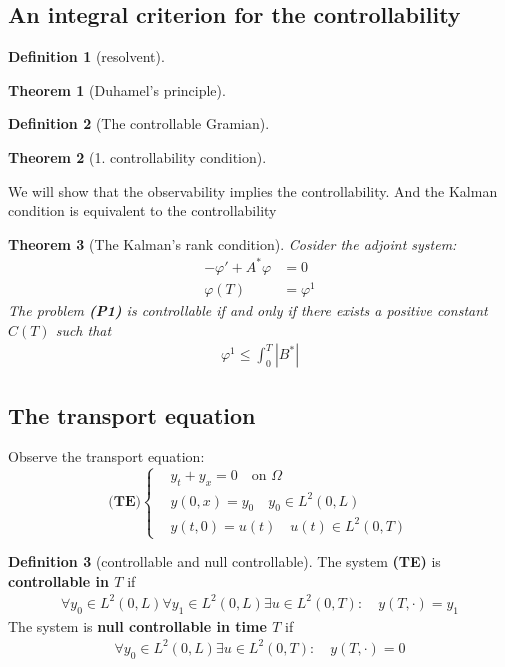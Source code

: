\documentclass[a4paper,11pt,fleqn]{book}
\newtheorem{theorem}{Theorem}[section]
\theoremstyle{definition}
\newtheorem{definition}{Definition}[section]
\theoremstyle{remark}
\begin{document}
\subsection*{An integral criterion for the controllability}

\begin{definition}[resolvent]
\end{definition}

\begin{theorem}[Duhamel's principle]
\end{theorem}

\begin{definition}[The controllable Gramian]
\end{definition}

\begin{theorem}[1. controllability condition]
\end{theorem}

We will show that the observability implies the controllability. And the Kalman condition is equivalent to the controllability

\begin{theorem}[The Kalman's rank condition]
Cosider the adjoint system:
\begin{align}
	-\varphi' + A^* \varphi &= 0\\
	\varphi(T) &= \varphi^1
\end{align}	The problem \textbf{(P1)} is controllable if and only if there exists a positive constant $C(T)$ such that
\begin{align}
	\varphi^1 \le \int_0^T | B^*|
\end{align} 
\end{theorem}


\subsection{The transport equation}
Observe the transport equation:
\begin{equation*}
\textbf{(TE)}
	\left\{
	\begin{aligned}
		&y_t + y_x = 0 \quad \text{on } \Omega \\
		&y(0, x) = y_0 \quad y_0 \in L^2(0, L)\\
		&y(t, 0) = u(t) \quad u(t) \in L^2(0, T)
	\end{aligned}
	\right.
\end{equation*}


\begin{definition}[controllable and null controllable]
	The system \textbf{(TE)} is \textbf{controllable in $T$} if 
	\begin{align*}
		\forall y_0 \in L^2(0, L) \forall y_1 \in L^2(0, L) \exists u \in L^2(0, T):\quad  y(T,\cdot) = y_1
	\end{align*} 
	The system is \textbf{null controllable in time $T$} if 
	\begin{align*}
		\forall y_0 \in L^2(0, L) \exists u \in L^2(0, T):\quad  y(T,\cdot) = 0
	\end{align*}
\end{definition}
\end{document}
